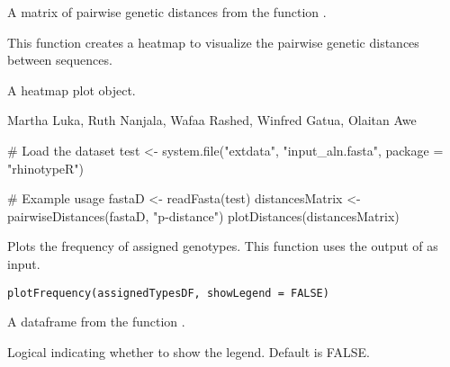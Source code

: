 \documentclass[a4paper]{book}
\begin{document}
%
\begin{Arguments}
\begin{ldescription}
\item[\code{distancesMatrix}] 
A matrix of pairwise genetic distances from the function .

\end{ldescription}
\end{Arguments}
%
\begin{Details}
This function creates a heatmap to visualize the pairwise genetic distances between sequences.
\end{Details}
%
\begin{Value}
A heatmap plot object.
\end{Value}
%
\begin{Author}
Martha Luka, Ruth Nanjala, Wafaa Rashed, Winfred Gatua, Olaitan Awe 
\end{Author}
%
\begin{SeeAlso}
\end{SeeAlso}
%
\begin{Examples}
\begin{ExampleCode}
# Load the dataset
test <- system.file("extdata", "input_aln.fasta", package = "rhinotypeR")

# Example usage
fastaD <- readFasta(test)
distancesMatrix <- pairwiseDistances(fastaD, "p-distance")
plotDistances(distancesMatrix)
\end{ExampleCode}
\end{Examples}
%
\begin{Description}
Plots the frequency of assigned genotypes. 
This function uses the output of  as input.
\end{Description}
%
\begin{Usage}
\begin{verbatim}
plotFrequency(assignedTypesDF, showLegend = FALSE)
\end{verbatim}
\end{Usage}
%
\begin{Arguments}
\begin{ldescription}
\item[\code{assignedTypesDF}] 
A dataframe from the function .

\item[\code{showLegend}] 
Logical indicating whether to show the legend. Default is FALSE.

\end{ldescription}
\end{Arguments}
\end{document}
